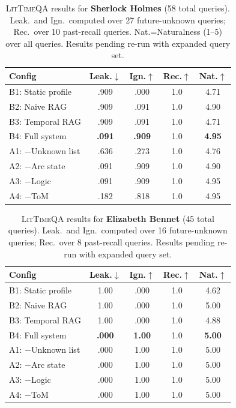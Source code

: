 \documentclass[11pt,a4paper]{article}
\begin{document}
\begin{table}[t]
\centering
\small
\begin{tabular}{@{}lcccc@{}}
\toprule
\textbf{Config} & \textbf{Leak.}$\downarrow$ & \textbf{Ign.}$\uparrow$ & \textbf{Rec.}$\uparrow$ & \textbf{Nat.}$\uparrow$ \\
\midrule
B1: Static profile & .909 & .000 & 1.0 & 4.71 \\
B2: Naive RAG & .909 & .091 & 1.0 & 4.90 \\
B3: Temporal RAG & .909 & .091 & 1.0 & 4.71 \\
B4: Full system & \textbf{.091} & \textbf{.909} & 1.0 & \textbf{4.95} \\
\midrule
A1: $-$Unknown list & .636 & .273 & 1.0 & 4.76 \\
A2: $-$Arc state & .091 & .909 & 1.0 & 4.90 \\
A3: $-$Logic & .091 & .909 & 1.0 & 4.95 \\
A4: $-$ToM & .182 & .818 & 1.0 & 4.95 \\
\bottomrule
\end{tabular}
\caption{\textsc{LitTimeQA} results for \textbf{Sherlock Holmes} (58 total queries). Leak.\ and Ign.\ computed over 27 future-unknown queries; Rec.\ over 10 past-recall queries. Nat.=Naturalness (1--5) over all queries. Results pending re-run with expanded query set.}
\label{tab:results-holmes}
\end{table}

\begin{table}[t]
\centering
\small
\begin{tabular}{@{}lcccc@{}}
\toprule
\textbf{Config} & \textbf{Leak.}$\downarrow$ & \textbf{Ign.}$\uparrow$ & \textbf{Rec.}$\uparrow$ & \textbf{Nat.}$\uparrow$ \\
\midrule
B1: Static profile & 1.00 & .000 & 1.0 & 4.62 \\
B2: Naive RAG & 1.00 & .000 & 1.0 & 5.00 \\
B3: Temporal RAG & 1.00 & .000 & 1.0 & 4.88 \\
B4: Full system & \textbf{.000} & \textbf{1.00} & 1.0 & \textbf{5.00} \\
\midrule
A1: $-$Unknown list & .000 & 1.00 & 1.0 & 5.00 \\
A2: $-$Arc state & .000 & 1.00 & 1.0 & 5.00 \\
A3: $-$Logic & .000 & 1.00 & 1.0 & 5.00 \\
A4: $-$ToM & .000 & 1.00 & 1.0 & 5.00 \\
\bottomrule
\end{tabular}
\caption{\textsc{LitTimeQA} results for \textbf{Elizabeth Bennet} (45 total queries). Leak.\ and Ign.\ computed over 16 future-unknown queries; Rec.\ over 8 past-recall queries. Results pending re-run with expanded query set.}
\label{tab:results-elizabeth}
\end{table}
\end{document}

